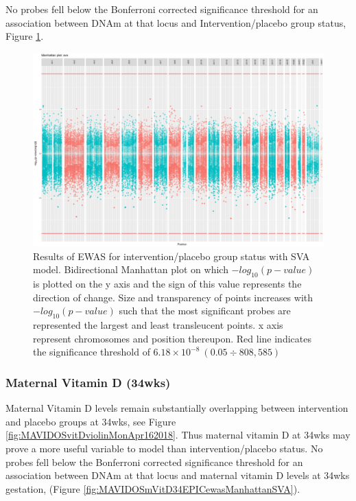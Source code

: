 \documentclass[
]{book}
\begin{document}
No probes fell below the Bonferroni corrected significance threshold for an association between DNAm at that locus and Intervention/placebo group status, Figure \ref{fig:MAVIDOSccEPICewasManhattanSVA}.

\begin{figure}

{\centering \includegraphics[width=0.8\linewidth]{figs/MAVIDOSccEPICewasManhattanSVA} 

}

\caption{Results of EWAS for intervention/placebo group status with SVA model. Bidirectional Manhattan plot on which \(-log_{10}(p-value)\) is plotted on the y axis and the sign of this value represents the direction of change. Size and transparency of points increases with \(-log_{10}(p-value)\) such that the most significant probes are represented the largest and least transleucent points. x axis represent chromosomes and position thereupon. Red line indicates the significance threshold of \(6.18\times10^{-8}~(0.05\div808,585)\)}\label{fig:MAVIDOSccEPICewasManhattanSVA}
\end{figure}



\hypertarget{maternal-vitamin-d-34wks}{%
\subsubsection{Maternal Vitamin D (34wks)}\label{maternal-vitamin-d-34wks}}

Maternal Vitamin D levels remain substantially overlapping between intervention and placebo groups at 34wks, see Figure \ref{fig:MAVIDOSvitDviolinMonApr162018}.
Thus maternal vitamin D at 34wks may prove a more useful variable to model than intervention/placebo status.
No probes fell below the Bonferroni corrected significance threshold for an association between DNAm at that locus and maternal vitamin D levels at 34wks gestation, (Figure \ref{fig:MAVIDOSmVitD34EPICewasManhattanSVA}).
\end{document}
